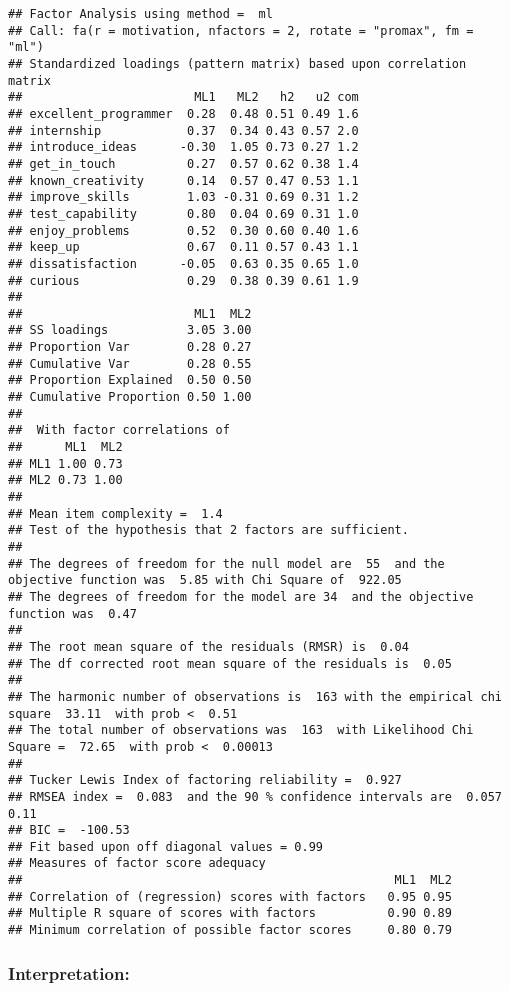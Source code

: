 \documentclass[
]{article}
\begin{document}
\begin{verbatim}
## Factor Analysis using method =  ml
## Call: fa(r = motivation, nfactors = 2, rotate = "promax", fm = "ml")
## Standardized loadings (pattern matrix) based upon correlation matrix
##                        ML1   ML2   h2   u2 com
## excellent_programmer  0.28  0.48 0.51 0.49 1.6
## internship            0.37  0.34 0.43 0.57 2.0
## introduce_ideas      -0.30  1.05 0.73 0.27 1.2
## get_in_touch          0.27  0.57 0.62 0.38 1.4
## known_creativity      0.14  0.57 0.47 0.53 1.1
## improve_skills        1.03 -0.31 0.69 0.31 1.2
## test_capability       0.80  0.04 0.69 0.31 1.0
## enjoy_problems        0.52  0.30 0.60 0.40 1.6
## keep_up               0.67  0.11 0.57 0.43 1.1
## dissatisfaction      -0.05  0.63 0.35 0.65 1.0
## curious               0.29  0.38 0.39 0.61 1.9
## 
##                        ML1  ML2
## SS loadings           3.05 3.00
## Proportion Var        0.28 0.27
## Cumulative Var        0.28 0.55
## Proportion Explained  0.50 0.50
## Cumulative Proportion 0.50 1.00
## 
##  With factor correlations of 
##      ML1  ML2
## ML1 1.00 0.73
## ML2 0.73 1.00
## 
## Mean item complexity =  1.4
## Test of the hypothesis that 2 factors are sufficient.
## 
## The degrees of freedom for the null model are  55  and the objective function was  5.85 with Chi Square of  922.05
## The degrees of freedom for the model are 34  and the objective function was  0.47 
## 
## The root mean square of the residuals (RMSR) is  0.04 
## The df corrected root mean square of the residuals is  0.05 
## 
## The harmonic number of observations is  163 with the empirical chi square  33.11  with prob <  0.51 
## The total number of observations was  163  with Likelihood Chi Square =  72.65  with prob <  0.00013 
## 
## Tucker Lewis Index of factoring reliability =  0.927
## RMSEA index =  0.083  and the 90 % confidence intervals are  0.057 0.11
## BIC =  -100.53
## Fit based upon off diagonal values = 0.99
## Measures of factor score adequacy             
##                                                    ML1  ML2
## Correlation of (regression) scores with factors   0.95 0.95
## Multiple R square of scores with factors          0.90 0.89
## Minimum correlation of possible factor scores     0.80 0.79
\end{verbatim}

\hypertarget{interpretation-10}{%
\subsubsection{Interpretation:}\label{interpretation-10}}
\end{document}
